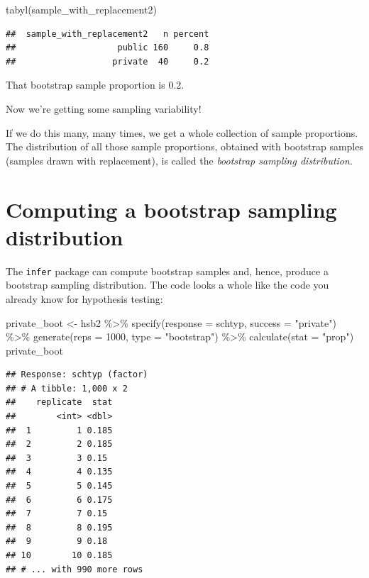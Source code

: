 \documentclass[
]{book}
\newenvironment{Shaded}{\begin{snugshade}}{\end{snugshade}}
\newcommand{\AttributeTok}[1]{\textcolor[rgb]{0.77,0.63,0.00}{#1}}
\newcommand{\DecValTok}[1]{\textcolor[rgb]{0.00,0.00,0.81}{#1}}
\newcommand{\FunctionTok}[1]{\textcolor[rgb]{0.00,0.00,0.00}{#1}}
\newcommand{\NormalTok}[1]{#1}
\newcommand{\OtherTok}[1]{\textcolor[rgb]{0.56,0.35,0.01}{#1}}
\newcommand{\SpecialCharTok}[1]{\textcolor[rgb]{0.00,0.00,0.00}{#1}}
\newcommand{\StringTok}[1]{\textcolor[rgb]{0.31,0.60,0.02}{#1}}
\begin{document}
\begin{Shaded}
\begin{Highlighting}[]
\FunctionTok{tabyl}\NormalTok{(sample\_with\_replacement2)}
\end{Highlighting}
\end{Shaded}

\begin{verbatim}
##  sample_with_replacement2   n percent
##                    public 160     0.8
##                   private  40     0.2
\end{verbatim}

That bootstrap sample proportion is 0.2.

Now we're getting some sampling variability!

If we do this many, many times, we get a whole collection of sample proportions. The distribution of all those sample proportions, obtained with bootstrap samples (samples drawn with replacement), is called the \emph{bootstrap sampling distribution}.

\hypertarget{ci-computing-boot}{%
\section{Computing a bootstrap sampling distribution}\label{ci-computing-boot}}

The \texttt{infer} package can compute bootstrap samples and, hence, produce a bootstrap sampling distribution. The code looks a whole like the code you already know for hypothesis testing:

\begin{Shaded}
\begin{Highlighting}[]
\NormalTok{private\_boot }\OtherTok{\textless{}{-}}\NormalTok{ hsb2 }\SpecialCharTok{\%\textgreater{}\%}
    \FunctionTok{specify}\NormalTok{(}\AttributeTok{response =}\NormalTok{ schtyp, }\AttributeTok{success =} \StringTok{"private"}\NormalTok{) }\SpecialCharTok{\%\textgreater{}\%}
    \FunctionTok{generate}\NormalTok{(}\AttributeTok{reps =} \DecValTok{1000}\NormalTok{, }\AttributeTok{type =} \StringTok{"bootstrap"}\NormalTok{) }\SpecialCharTok{\%\textgreater{}\%}
    \FunctionTok{calculate}\NormalTok{(}\AttributeTok{stat =} \StringTok{"prop"}\NormalTok{)}
\NormalTok{private\_boot}
\end{Highlighting}
\end{Shaded}

\begin{verbatim}
## Response: schtyp (factor)
## # A tibble: 1,000 x 2
##    replicate  stat
##        <int> <dbl>
##  1         1 0.185
##  2         2 0.185
##  3         3 0.15 
##  4         4 0.135
##  5         5 0.145
##  6         6 0.175
##  7         7 0.15 
##  8         8 0.195
##  9         9 0.18 
## 10        10 0.185
## # ... with 990 more rows
\end{verbatim}
\end{document}
